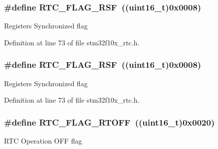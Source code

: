 \subsubsection[{\texorpdfstring{R\+T\+C\+\_\+\+F\+L\+A\+G\+\_\+\+R\+SF}{RTC_FLAG_RSF}}]{\setlength{\rightskip}{0pt plus 5cm}\#define R\+T\+C\+\_\+\+F\+L\+A\+G\+\_\+\+R\+SF~(({\bf uint16\+\_\+t})0x0008)}\hypertarget{group___r_t_c__interrupts__flags_ga78c4245996bef8d5f39226b6e37ed9c0}{}\label{group___r_t_c__interrupts__flags_ga78c4245996bef8d5f39226b6e37ed9c0}
Registers Synchronized flag 

Definition at line 73 of file stm32f10x\+\_\+rtc.\+h.

\subsubsection[{\texorpdfstring{R\+T\+C\+\_\+\+F\+L\+A\+G\+\_\+\+R\+SF}{RTC_FLAG_RSF}}]{\setlength{\rightskip}{0pt plus 5cm}\#define R\+T\+C\+\_\+\+F\+L\+A\+G\+\_\+\+R\+SF~(({\bf uint16\+\_\+t})0x0008)}\hypertarget{group___r_t_c__interrupts__flags_ga78c4245996bef8d5f39226b6e37ed9c0}{}\label{group___r_t_c__interrupts__flags_ga78c4245996bef8d5f39226b6e37ed9c0}
Registers Synchronized flag 

Definition at line 73 of file stm32f10x\+\_\+rtc.\+h.

\subsubsection[{\texorpdfstring{R\+T\+C\+\_\+\+F\+L\+A\+G\+\_\+\+R\+T\+O\+FF}{RTC_FLAG_RTOFF}}]{\setlength{\rightskip}{0pt plus 5cm}\#define R\+T\+C\+\_\+\+F\+L\+A\+G\+\_\+\+R\+T\+O\+FF~(({\bf uint16\+\_\+t})0x0020)}\hypertarget{group___r_t_c__interrupts__flags_ga203dcbb991497e4d0e6722815f6db942}{}\label{group___r_t_c__interrupts__flags_ga203dcbb991497e4d0e6722815f6db942}
R\+TC Operation O\+FF flag 

